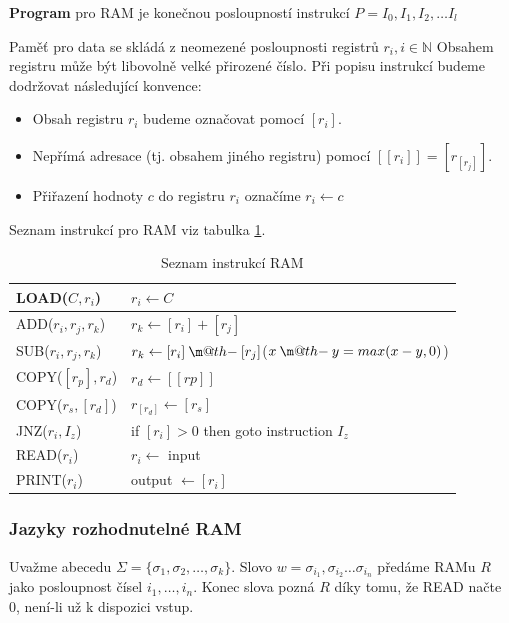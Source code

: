 \documentclass[11pt]{report} %
\makeatletter
\numberwithin{equation}{section}
\newcommand{\dotminus}{\mathbin{\text{\@dotminus}}}
\newcommand{\@dotminus}{%
	\ooalign{\hidewidth\raise1ex\hbox{.}\hidewidth\cr$\m@th-$\cr}%
}
\makeatother
\begin{document}
\textbf{Program} pro RAM je konečnou posloupností instrukcí $P = I_0, I_1, I_2, \dots I_l$

Paměť pro data se skládá z neomezené posloupnosti registrů $r_i, i \in \mathbb{N}$ Obsahem registru může být libovolně velké přirozené číslo. Při popisu instrukcí budeme dodržovat následující konvence:
\begin{itemize}
	
	
	\item Obsah registru $r_i$ budeme označovat pomocí $[r_i]$.
	\item Nepřímá adresace (tj. obsahem jiného registru) pomocí $[[r_i]] = [r_{[r_j]}]$. 
	\item Přiřazení hodnoty $c$ do registru $r_i$ označíme $r_i \leftarrow c$
\end{itemize}

Seznam instrukcí pro RAM viz tabulka \ref{ram_instrukce}.
\begin{table}[H]
	\centering
	\renewcommand{\arraystretch}{1.5}
	\begin{tabular}{|l|l|}
		\hline
		LOAD($C, r_i$) 			& $r_i \leftarrow C$ 							\\ \hline
		ADD($r_i, r_j, r_k$) 	& $r_k \leftarrow [r_i] + [r_j]$				\\ \hline
		SUB($r_i, r_j, r_k$) 	& $r_k \leftarrow [r_i] \dotminus [r_j]$\quad ($x \dotminus y = max(x-y, 0)$)    	\\ \hline
		COPY($[r_p], r_d$) 		& $r_d \leftarrow [[rp]]$				 		\\ \hline
		COPY($r_s,[r_d]$) 		& $r_{[r_d]} \leftarrow [r_s]$                  \\ \hline
		JNZ($r_i, I_z$) 		& if $[r_i] > 0$ then goto instruction $I_z$ 	\\ \hline
		READ($r_i$) 			& $r_i \leftarrow$ input						\\ \hline
		PRINT($r_i$) 			& output $\leftarrow [r_i]$   					\\ \hline
	\end{tabular}
	\caption{Seznam instrukcí RAM}
	\label{ram_instrukce}
\end{table}

\subsubsection{Jazyky rozhodnutelné RAM}
Uvažme abecedu $\Sigma = \{\sigma_1, \sigma_2, \dots, \sigma_k\}$. Slovo $w = \sigma_{i_1}, \sigma_{i_2} \dots \sigma_{i_n}$ předáme RAMu $R$ jako posloupnost čísel $i_1, \dots, i_n$. Konec slova pozná $R$ díky tomu, že READ načte 0, není-li už k dispozici vstup.
\end{document}
